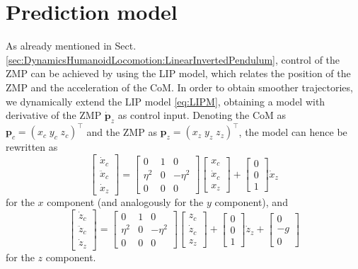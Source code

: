 \section{Prediction model}
As already mentioned in Sect. \ref{sec:DynamicsHumanoidLocomotion:LinearInvertedPendulum},
control of the ZMP can be achieved by using the LIP model, which relates the 
position of the ZMP and the acceleration of the CoM. In order to obtain smoother
trajectories, we dynamically extend the LIP model \eqref{eq:LIPM}, obtaining a
model with derivative of the ZMP $\dot{\bm{p}}_z$ as control input. Denoting
the CoM as $\bm{p}_c = (x_c \; y_c \; z_c)^\top$ and the ZMP as $\bm{p}_z = (x_z \; y_z \; z_z)^\top$, the 
model can hence be rewritten as
\begin{equation}
    \label{eq:LIPM-x-dynamic-extension}
    \begin{bmatrix}
        \dot{x}_c \\ \ddot{x}_c \\ \dot{x}_z 
    \end{bmatrix}
    =
    \begin{bmatrix}
        0 & 1 & 0 \\ 
        \eta^2 & 0 & -\eta^2 \\
        0 & 0 & 0
    \end{bmatrix}
    \begin{bmatrix}
        x_c \\ \dot{x}_c \\ x_z 
    \end{bmatrix}
    +
    \begin{bmatrix}
        0 \\ 0 \\ 1
    \end{bmatrix}
    \dot{x}_z
\end{equation}
for the $x$ component (and analogously for the $y$ component), and
\begin{equation}
    \label{eq:LIPM-x-dynamic-extension}
    \begin{bmatrix}
        \dot{z}_c \\ \ddot{z}_c \\ \dot{z}_z 
    \end{bmatrix}
    =
    \begin{bmatrix}
        0 & 1 & 0 \\ 
        \eta^2 & 0 & -\eta^2 \\
        0 & 0 & 0
    \end{bmatrix}
    \begin{bmatrix}
        z_c \\ \dot{z}_c \\ z_z 
    \end{bmatrix}
    +
    \begin{bmatrix}
        0 \\ 0 \\ 1
    \end{bmatrix}
    \dot{z}_z
    +
    \begin{bmatrix}
        0 \\ -g \\ 0
    \end{bmatrix}
\end{equation}
for the $z$ component.

